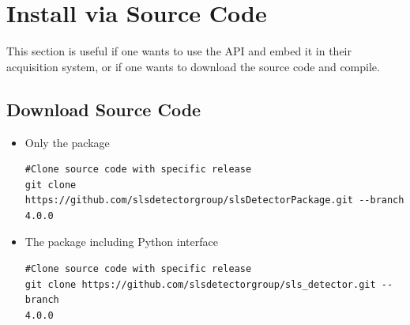 \documentclass{article}
\begin{document}
\clearpage
\section{Install via Source Code}
This section is useful if one wants to use the API and embed it in their
acquisition system, or if one wants to download the source code and compile.

\subsection{Download Source Code}

\begin{itemize}
 \item Only the package
\begin{verbatim}
#Clone source code with specific release
git clone https://github.com/slsdetectorgroup/slsDetectorPackage.git --branch
4.0.0
\end{verbatim}
 \item The package including Python interface
\begin{verbatim}
#Clone source code with specific release
git clone https://github.com/slsdetectorgroup/sls_detector.git --branch
4.0.0
\end{verbatim}
\end{itemize}
\end{document}
